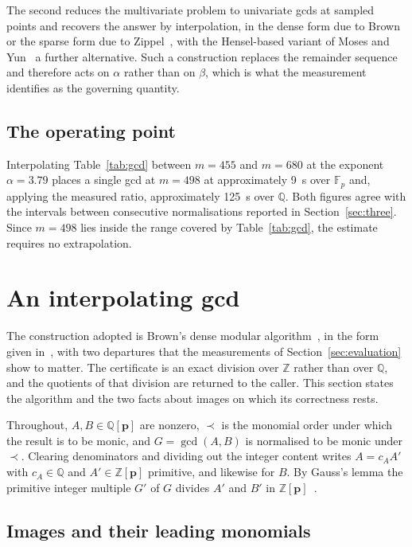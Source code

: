 \documentclass[11pt,a4paper]{article}
\theoremstyle{plain}
\theoremstyle{definition}
\theoremstyle{remark}
\newcommand{\FF}{\mathbb{F}}
\newcommand{\QQ}{\mathbb{Q}}
\newcommand{\bp}{\boldsymbol{p}}
\begin{document}
The second reduces the multivariate problem to univariate gcds at sampled points and recovers the
answer by interpolation, in the dense form due to Brown~\cite{brown1971} or the sparse form due to
Zippel~\cite{zippel1979}, with the Hensel-based variant of Moses and Yun~\cite{mosesyun1973} a further
alternative. Such a construction replaces the remainder sequence and therefore acts on $\alpha$ rather
than on $\beta$, which is what the measurement identifies as the governing quantity.

\subsection{The operating point}

Interpolating Table~\ref{tab:gcd} between $m = 455$ and $m = 680$ at the exponent $\alpha = 3.79$
places a single gcd at $m = 498$ at approximately \SI{9}{\second} over $\FF_p$ and, applying the
measured ratio, approximately \SI{125}{\second} over $\QQ$. Both figures agree with the intervals
between consecutive normalisations reported in Section~\ref{sec:three}. Since $m = 498$ lies inside the
range covered by Table~\ref{tab:gcd}, the estimate requires no extrapolation.

\section{An interpolating gcd}
\label{sec:method}

The construction adopted is Brown's dense modular algorithm~\cite{brown1971}, in the form given
in~\cite[Sec.~7.4]{geddes1992}, with two departures that the measurements of
Section~\ref{sec:evaluation} show to matter. The certificate is an exact division over $\mathbb{Z}$
rather than over $\QQ$, and the quotients of that division are returned to the caller. This section
states the algorithm and the two facts about images on which its correctness rests.

Throughout, $A, B \in \QQ[\bp]$ are nonzero, $\prec$ is the monomial order under which the result is
to be monic, and $G = \gcd(A,B)$ is normalised to be monic under $\prec$. Clearing denominators and
dividing out the integer content writes $A = c_A A'$ with $c_A \in \QQ$ and $A' \in \mathbb{Z}[\bp]$
primitive, and likewise for $B$. By Gauss's lemma the primitive integer multiple $G'$ of $G$ divides
$A'$ and $B'$ in $\mathbb{Z}[\bp]$~\cite[Sec.~6.2]{vzgg2013}.

\subsection{Images and their leading monomials}
\end{document}
